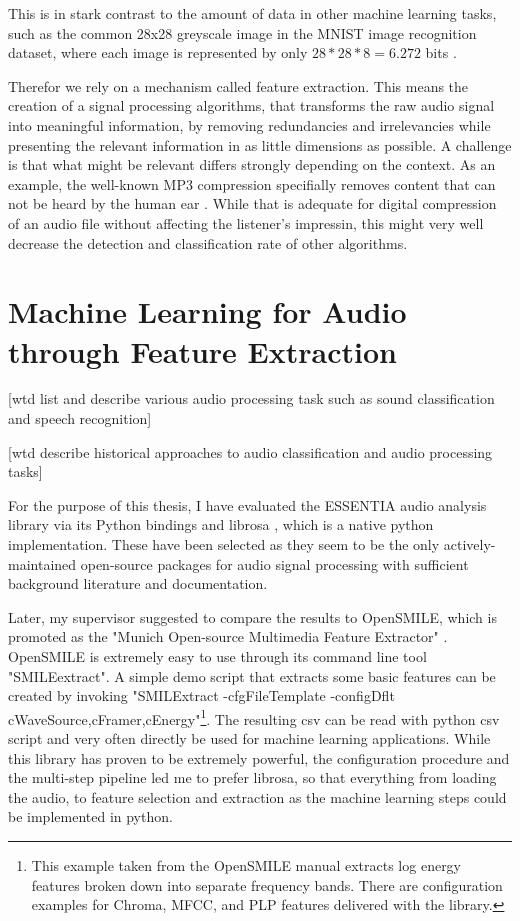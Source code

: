 This is in stark contrast to the amount of data in other machine learning tasks, such as the common 28x28 greyscale image in the MNIST image recognition dataset, where each image is represented by only $28*28*8 = 6.272$ bits \cite{lecun1998mnist}.

Therefor we rely on a mechanism called feature extraction. This means the creation of a signal processing algorithms, that transforms the raw audio signal into meaningful information, by removing redundancies and irrelevancies while presenting the relevant information in as little dimensions as possible. A challenge is that what might be relevant differs strongly depending on the context. As an example, the well-known MP3 compression specifially removes content that can not be heard by the human ear \cite{brandenburg1999mp3}. While that is adequate for digital compression of an audio file without affecting the  listener's impressin, this might very well decrease the detection and classification rate of other algorithms.  


\section{Machine Learning for Audio through Feature Extraction}


[wtd list and describe various audio processing task such as sound classification and speech recognition]

[wtd describe historical approaches to audio classification and audio processing tasks]


For the purpose of this thesis, I have evaluated the ESSENTIA audio analysis library \cite{bogdanov:Essentia:ACMMULTIMEDIA13} via its Python bindings and librosa \cite{BMcFee:librosa}, which is a native python implementation. 
These have been selected as they seem to be the only actively-maintained open-source packages for audio signal processing with sufficient background literature and documentation. 

Later, my supervisor suggested to compare the results to OpenSMILE, which is promoted as the "Munich Open-source Multimedia Feature Extractor" \cite{Eyben:2013:RDO:2502081.2502224}.
OpenSMILE is extremely easy to use through its command line tool "SMILEextract". A simple demo script that extracts some basic features can be created by invoking "SMILExtract -cfgFileTemplate -configDflt cWaveSource,cFramer,cEnergy"\footnote{This example taken from the OpenSMILE manual extracts log energy features broken down into separate frequency bands. There are configuration examples for Chroma, MFCC, and PLP features delivered with the library.}.
The resulting csv can be read with python csv script and very often directly be used for machine learning applications. While this library has proven to be extremely powerful, the  configuration procedure and the multi-step pipeline led me to prefer librosa, so that everything from loading the audio, to feature selection and extraction as the machine learning steps could be implemented in python.  %

